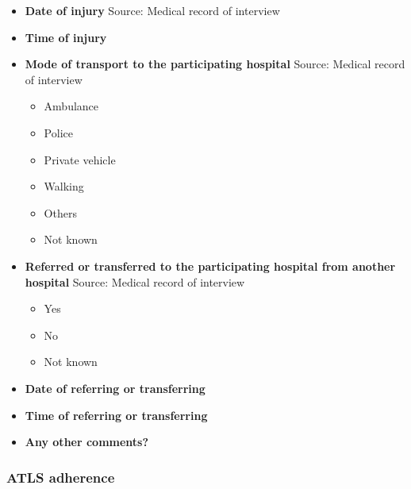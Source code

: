 \documentclass[
]{scrartcl}
\providecommand{\tightlist}{%
  \setlength{\itemsep}{0pt}\setlength{\parskip}{0pt}}\usepackage{longtable,booktabs,array}
\begin{document}
\begin{itemize}
\item
  \textbf{Date of injury} Source: Medical record of interview
\item
  \textbf{Time of injury}
\item
  \textbf{Mode of transport to the participating hospital} Source:
  Medical record of interview

  \begin{itemize}
  \tightlist
  \item
    Ambulance
  \item
    Police
  \item
    Private vehicle
  \item
    Walking
  \item
    Others
  \item
    Not known
  \end{itemize}
\item
  \textbf{Referred or transferred to the participating hospital from
  another hospital} Source: Medical record of interview

  \begin{itemize}
  \tightlist
  \item
    Yes
  \item
    No
  \item
    Not known
  \end{itemize}
\item
  \textbf{Date of referring or transferring}
\item
  \textbf{Time of referring or transferring}
\item
  \textbf{Any other comments?}
\end{itemize}

\subsubsection{ATLS adherence}\label{atls-adherence}
\end{document}
